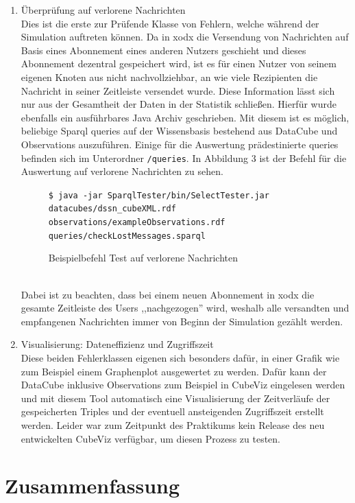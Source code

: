 \documentclass{article}
\begin{document}
\begin{enumerate}
{	}
	\item{Überprüfung auf verlorene Nachrichten\\
	Dies ist die erste zur Prüfende Klasse von Fehlern, welche während der Simulation auftreten können. Da in xodx die Versendung von Nachrichten auf Basis eines Abonnement eines anderen Nutzers geschieht und dieses Abonnement dezentral gespeichert wird, ist es für einen Nutzer von seinem eigenen Knoten aus nicht nachvollziehbar, an wie viele Rezipienten die Nachricht in seiner Zeitleiste versendet wurde. Diese Information lässt sich nur aus der Gesamtheit der Daten in der Statistik schließen. Hierfür wurde ebenfalls ein ausführbares Java Archiv geschrieben. Mit diesem ist es möglich, beliebige Sparql queries auf der Wissensbasis bestehend aus DataCube und Observations auszuführen. Einige für die Auswertung prädestinierte queries befinden sich im Unterordner \texttt{/queries}. In Abbildung 3 ist der Befehl für die Auswertung auf verlorene Nachrichten zu sehen.
	\begin{figure}[ht]
	\centering
	\texttt{\$ java -jar SparqlTester/bin/SelectTester.jar datacubes/dssn\_cubeXML.rdf observations/exampleObservations.rdf queries/checkLostMessages.sparql}
	\caption{Beispielbefehl Test auf verlorene Nachrichten}
	\end{figure}\\
	Dabei ist zu beachten, dass bei einem neuen Abonnement in xodx die gesamte Zeitleiste des Users ,,nachgezogen'' wird, weshalb alle versandten und empfangenen Nachrichten immer von Beginn der Simulation gezählt werden.
	}
	\item{Visualisierung: Dateneffizienz und Zugriffszeit\\
	Diese beiden Fehlerklassen eigenen sich besonders dafür, in einer Grafik wie zum Beispiel einem Graphenplot ausgewertet zu werden. Dafür kann der DataCube inklusive Observations zum Beispiel in CubeViz eingelesen werden und mit diesem Tool automatisch eine Visualisierung der Zeitverläufe der gespeicherten Triples und der eventuell ansteigenden Zugriffszeit erstellt werden. Leider war zum Zeitpunkt des Praktikums kein Release des neu entwickelten CubeViz verfügbar, um diesen Prozess zu testen.	
	}
\end{enumerate}

\section{Zusammenfassung}
\end{document}
